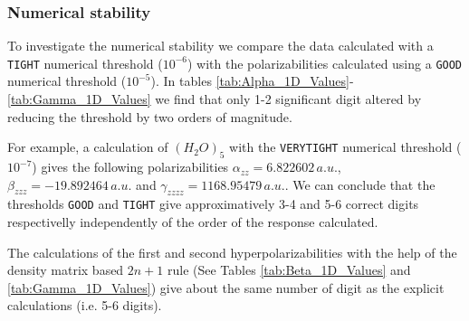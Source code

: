 \documentclass[prl,aps,letterpaper,twocolumn,showpacs,twocolumngrid,superbib]{revtex4}
\begin{document}
\subsubsection{Numerical stability}

To investigate the numerical stability we compare the data calculated
with a {\tt TIGHT} numerical threshold ($10^{-6}$) with the polarizabilities
calculated using a {\tt GOOD} numerical threshold ($10^{-5}$). 
In tables \ref{tab:Alpha_1D_Values}-\ref{tab:Gamma_1D_Values} we find that
only 1-2 significant digit altered by reducing the threshold by two orders 
of magnitude. 

For example, a calculation of $(H_2O)_5$ with the {\tt VERYTIGHT} numerical threshold ($10^{-7}$) 
gives the following polarizabilities $\alpha_{zz}=6.822602\,a.u.$, $\beta_{zzz}=-19.892464\,a.u.$ and
$\gamma_{zzzz}=1168.95479\,a.u.$. We can conclude that the thresholds 
{\tt GOOD} and {\tt TIGHT} give approximatively 3-4 and 5-6 
correct digits respectivelly independently of the order of the response calculated.

The calculations of the first and second hyperpolarizabilities with the help of
the density matrix based $2n+1$ rule (See Tables \ref{tab:Beta_1D_Values} and \ref{tab:Gamma_1D_Values}) 
give about the same number of digit as the explicit calculations (i.e. 5-6 digits).



\end{document}
